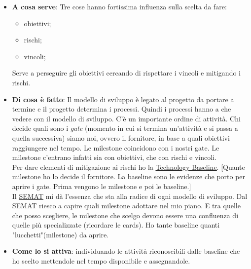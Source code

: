 		\begin{itemize}
			\item \textbf{A cosa serve}:
			Tre cose hanno fortissima influenza sulla scelta da fare:
			\begin{itemize}
				\item obiettivi;
				\item rischi;
				\item vincoli;
			\end{itemize}
			Serve a perseguire gli obiettivi cercando di rispettare i vincoli e mitigando i rischi.
			\item \textbf{Di cosa è fatto}:
			Il modello di sviluppo è legato al progetto da portare a termine e il progetto determina i processi. Quindi i processi hanno a che vedere con il modello di sviluppo. C'è un importante ordine di attività. Chi decide quali sono i \textit{gate} (momento in cui si termina un'attività e si passa a quella successiva) siamo noi, ovvero il fornitore, in base a quali obiettivi raggiungere nel tempo. Le milestone coincidono con i nostri gate. Le milestone c'entrano infatti sia con obiettivi, che con rischi e vincoli. \\
			Per dare elementi di mitigazione ai rischi ho la \underline{\hyperref[technologybaseline]{Technology Baseline}}. [Quante milestone ho lo decide il fornitore. La baseline sono le evidenze che porto per aprire i gate. Prima vengono le milestone e poi le baseline.] \\
			Il \underline{\hyperref[semat]{SEMAT}} mi dà l'essenza che sta alla radice di ogni modello di sviluppo. Dal SEMAT riesco a capire quali milestone adottare nel mio piano. E tra quelle che posso scegliere, le milestone che scelgo devono essere una confluenza di quelle più specializzate (ricordare le cards). Ho tante baseline quanti "lucchetti"(milestone) da aprire.
			\item \textbf{Come lo si attiva}: individuando le attività riconoscibili dalle baseline che ho scelto mettendole nel tempo disponibile e assegnandole.
		\end{itemize}

